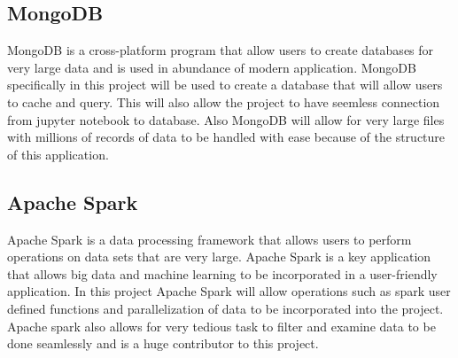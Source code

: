 \documentclass[conference,twoside]{IEEEtran}
\begin{document}
\subsection{MongoDB}
	MongoDB is a cross-platform program that allow users to create databases for very large data and is used in abundance of modern application. MongoDB specifically in this project will be used to create a database that will allow users to cache and query. This will also allow the project to have seemless connection from jupyter notebook to database. Also MongoDB will allow for very large files with millions of records of data to be handled with ease because of the structure of this application.


\subsection{Apache Spark}
	Apache Spark is a data processing framework that allows users to perform operations on data sets that are very large. Apache Spark is a key application that allows big data and machine learning to be incorporated in a user-friendly application. In this project Apache Spark will allow operations such as spark user defined functions and parallelization of data to be incorporated into the project. Apache spark also allows for very tedious task to filter and examine data to be done seamlessly and is a huge contributor to this project.


\end{document}
